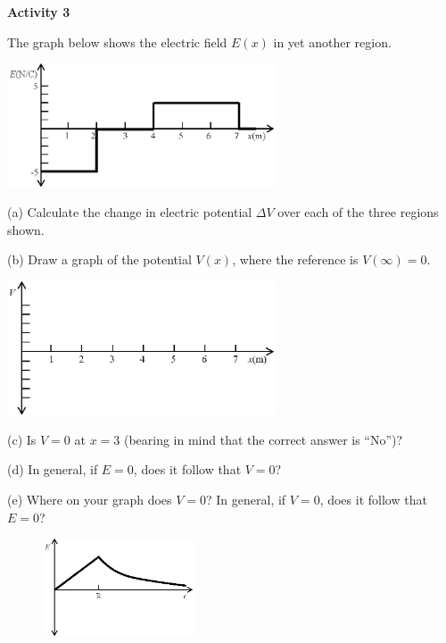 \answerspace{1.1in}

\pagebreak[2]
\textbf{Activity 3} 

The graph below shows the electric field $E(x)$ in yet another region.
\begin{center}
\includegraphics[width=0.6\textwidth]{finding_v_from_e/fig5.eps}
\end{center}

(a) Calculate the change in electric potential $\Delta V$ over each of the three regions shown.
\vspace{1.2in}

(b) Draw a graph of the potential $V(x)$, where the reference is $V(\infty)=0$.
\begin{center}
\includegraphics[width=0.6\textwidth]{finding_v_from_e/fig6.eps}
\end{center}

(c) Is $V=0$ at $x=3$ (bearing in mind that the correct answer is ``No'')?
\vspace{0.6in}

(d) In general, if $E=0$, does it follow that $V=0$?
\vspace{0.6in}

(e) Where on your graph does $V=0$?  In general, if $V=0$, does it follow that $E=0$?
\vspace{0.6in}

\pagebreak[2]
\begin{figure}
    \includegraphics[width=0.4\textwidth]{finding_v_from_e/fig7.eps}
\end{figure}

